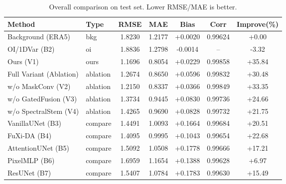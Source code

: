\begin{table}[t]
\centering
\caption{Overall comparison on test set. Lower RMSE/MAE is better.}
\begin{tabular}{llccccc}
\toprule
Method & Type & RMSE & MAE & Bias & Corr & Improve(\%)\\
\midrule
Background (ERA5) & bkg & 1.8230 & 1.2177 & +0.0020 & 0.99624 & +0.00\\
OI/1DVar (B2) & oi & 1.8836 & 1.2798 & -0.0014 & -- & -3.32\\
Ours (V1) & ours & 1.1696 & 0.8054 & +0.0229 & 0.99858 & +35.84\\
Full Variant (Ablation) & ablation & 1.2674 & 0.8650 & +0.0596 & 0.99832 & +30.48\\
w/o MaskConv (V2) & ablation & 1.2150 & 0.8337 & +0.0366 & 0.99849 & +33.35\\
w/o GatedFusion (V3) & ablation & 1.3734 & 0.9445 & +0.0830 & 0.99736 & +24.66\\
w/o SpectralStem (V4) & ablation & 1.4265 & 0.9690 & +0.0828 & 0.99732 & +21.75\\
VanillaUNet (B3) & compare & 1.4491 & 1.0093 & +0.1664 & 0.99684 & +20.51\\
FuXi-DA (B4) & compare & 1.4095 & 0.9995 & +0.1043 & 0.99654 & +22.68\\
AttentionUNet (B5) & compare & 1.5092 & 1.0508 & +0.1778 & 0.99666 & +17.21\\
PixelMLP (B6) & compare & 1.6959 & 1.1654 & +0.1388 & 0.99628 & +6.97\\
ResUNet (B7) & compare & 1.5407 & 1.0784 & +0.1783 & 0.99630 & +15.49\\
\bottomrule
\end{tabular}
\end{table}
